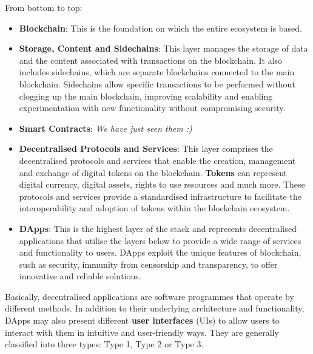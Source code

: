 From bottom to top:
\begin{itemize}
    \item \textbf{Blockchain}: This is the foundation on which the entire ecosystem is based. 
    \item \textbf{Storage, Content and Sidechains}: This layer manages the storage of data and the content associated with transactions on the blockchain. It also includes sidechains, which are separate blockchains connected to the main blockchain. Sidechains allow specific transactions to be performed without clogging up the main blockchain, improving scalability and enabling experimentation with new functionality without compromising security.
    \item \textbf{Smart Contracts}: \textit{We have just seen them :)}
    \item \textbf{Decentralised Protocols and Services}: This layer comprises the decentralised protocols and services that enable the creation, management and exchange of digital tokens on the blockchain. \textbf{Tokens} can represent digital currency, digital assets, rights to use resources and much more. These protocols and services provide a standardised infrastructure to facilitate the interoperability and adoption of tokens within the blockchain ecosystem.
    \item \textbf{DApps}: This is the highest layer of the stack and represents decentralised applications that utilise the layers below to provide a wide range of services and functionality to users. DApps exploit the unique features of blockchain, such as security, immunity from censorship and transparency, to offer innovative and reliable solutions.
\end{itemize}

Basically, decentralised applications are software programmes that operate by different methods. In addition to their underlying architecture and functionality, DApps may also present different \textbf{user interfaces} (UIs) to allow users to interact with them in intuitive and user-friendly ways. They are generally classified into three types: Type 1, Type 2 or Type 3.

